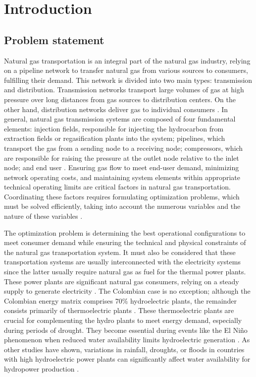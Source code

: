 \chapter{Introduction} \label{cap:introduccion}


\section{Problem statement}

Natural gas transportation is an integral part of the natural gas industry, relying on a pipeline network to transfer natural gas from various sources to consumers, fulfilling their demand. This network is divided into two main types: transmission and distribution. Transmission networks transport large volumes of gas at high pressure over long distances from gas sources to distribution centers. On the other hand, distribution networks deliver gas to individual consumers \cite{ABBASI2011xv}. In general, natural gas transmission systems are composed of four fundamental elements: injection fields, responsible for injecting the hydrocarbon from extraction fields or regasification plants into the system; pipelines, which transport the gas from a sending node to a receiving node; compressors, which are responsible for raising the pressure at the outlet node relative to the inlet node; and end user \cite{review}. Ensuring gas flow to meet end-user demand, minimizing network operating costs, and maintaining system elements within appropriate technical operating limits are critical factors in natural gas transportation. Coordinating these factors requires formulating optimization problems, which must be solved efficiently, taking into account the numerous variables and the nature of these variables \cite{Conejo}.


The optimization problem is determining the best operational configurations to meet consumer demand while ensuring the technical and physical constraints of the natural gas transportation system.  It must also be considered that these transportation systems are usually interconnected with the electricity systems since the latter usually require natural gas as fuel for the thermal power plants. These power plants are significant natural gas consumers, relying on a steady supply to generate electricity \cite{Byeon_Van_Hentenryck_2020}. The Colombian case is no exception; although the Colombian energy matrix comprises 70\% hydroelectric plants, the remainder consists primarily of thermoelectric plants \cite{Morcillo_Angulo_Franco_2020a}. These thermoelectric plants are crucial for complementing the hydro plants to meet energy demand, especially during periods of drought. They become essential during events like the El Niño phenomenon when reduced water availability limits hydroelectric generation \cite{droughts_colombia}. As other studies have shown, variations in rainfall, droughts, or floods in countries with high hydroelectric power plants can significantly affect water availability for hydropower production \cite{Cuartas_Cunha_Alves_Parra_Deusdará_Leal_Costa_Molina_Amore_Broedel_Seluchi_et_al_2022}. 

